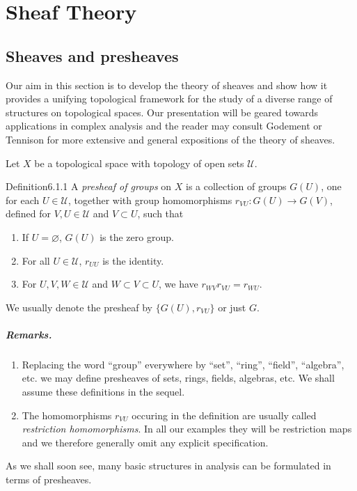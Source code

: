 \chapter{Sheaf Theory}\label{ch:6}
\ChapterSixIntroduction

\section{Sheaves and presheaves}\label{sec:6:1}
Our aim in this section is to develop the theory of sheaves and show how it provides a unifying topological framework for the study of a diverse range of structures on topological spaces. Our presentation will be geared towards applications in complex analysis and the reader may consult Godement \cite{bib:II:godement-r:1} or Tennison \cite{bib:II:tennison-b-r:1} for more extensive and general expositions of the theory of sheaves.

Let $X$ be a topological space with topology of open sets $\mathcal U$.

\begin{originaltheorem}{Definition}{6.1.1}
A \emph{presheaf of groups} on $X$ is a collection of groups $G(U)$, one for each $U\in\mathcal U$, together with group homomorphisms $r_{VU}:G(U)\to G(V)$, defined for $V,U\in\mathcal U$ and $V\subset U$, such that
\begin{enumerate}
\item If $U=\varnothing$, $G(U)$ is the zero group.
\item For all $U\in\mathcal U$, $r_{UU}$ is the identity.
\item For $U,V,W\in\mathcal U$ and $W\subset V\subset U$, we have $r_{WV}r_{VU}=r_{WU}$.
\end{enumerate}
We usually denote the presheaf by $\{G(U),r_{VU}\}$ or just $G$.
\end{originaltheorem}

\paragraph{Remarks.}
\begin{enumerate}
\item Replacing the word ``group'' everywhere by ``set'', ``ring'', ``field'', ``algebra'', etc. we may define presheaves of sets, rings, fields, algebras, etc. We shall assume these definitions in the sequel.
\item The homomorphisms $r_{VU}$ occuring in the definition are usually called \emph{restriction homomorphisms}. In all our examples they will be restriction maps and we therefore generally omit any explicit specification.
\end{enumerate}
As we shall soon see, many basic structures in analysis can be formulated in terms of presheaves.

